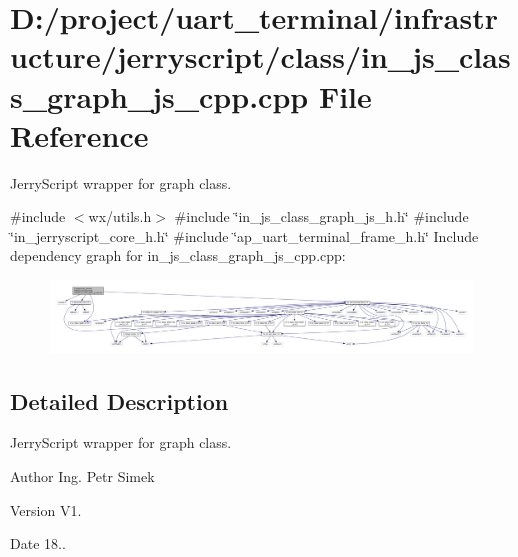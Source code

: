 \section{D\+:/project/uart\+\_\+terminal/infrastructure/jerryscript/class/in\+\_\+js\+\_\+class\+\_\+graph\+\_\+js\+\_\+cpp.cpp File Reference}
\label{in__js__class__graph__js__cpp_8cpp}


Jerry\+Script wrapper for graph class.  


{\ttfamily \#include $<$wx/utils.\+h$>$}\newline
{\ttfamily \#include \char`\"{}in\+\_\+js\+\_\+class\+\_\+graph\+\_\+js\+\_\+h.\+h\char`\"{}}\newline
{\ttfamily \#include \char`\"{}in\+\_\+jerryscript\+\_\+core\+\_\+h.\+h\char`\"{}}\newline
{\ttfamily \#include \char`\"{}ap\+\_\+uart\+\_\+terminal\+\_\+frame\+\_\+h.\+h\char`\"{}}\newline
Include dependency graph for in\+\_\+js\+\_\+class\+\_\+graph\+\_\+js\+\_\+cpp.\+cpp\+:\nopagebreak
\begin{figure}[H]
\begin{center}
\leavevmode
\includegraphics[width=350pt]{in__js__class__graph__js__cpp_8cpp__incl}
\end{center}
\end{figure}


\subsection{Detailed Description}
Jerry\+Script wrapper for graph class. 

\begin{DoxyAuthor}{Author}
Ing. Petr Simek 
\end{DoxyAuthor}
\begin{DoxyVersion}{Version}
V1. 
\end{DoxyVersion}
\begin{DoxyDate}{Date}
18.. 
\end{DoxyDate}
